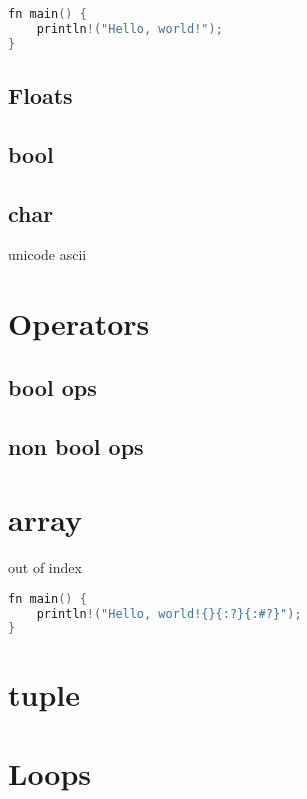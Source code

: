 \documentclass{book}
\begin{document}
\begin{lstlisting}[language=C, caption=Definition variables]
fn main() {
    println!("Hello, world!");
}
\end{lstlisting}
\subsection{Floats}
\subsection{bool}
\subsection{char}
unicode
ascii
\section{Operators}
\subsection{bool ops}
\subsection{non bool ops}
\section{array}
out of index
\begin{lstlisting}[language=C, caption=Definition variables]
fn main() {
    println!("Hello, world!{}{:?}{:#?}");
}
\end{lstlisting}
\section{tuple}

\section{Loops}

\lstlistoflistings
\end{document}
